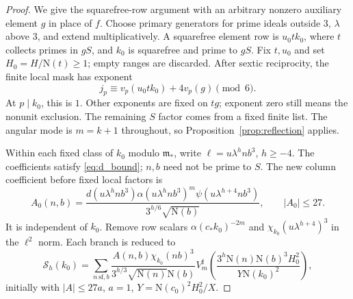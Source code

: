 \documentclass[11pt,a4paper]{article}
\numberwithin{equation}{section}
\theoremstyle{definition}
\theoremstyle{remark}
\newcommand{\N}{\mathrm N}
\begin{document}
\begin{proof}
We give the squarefree-row argument with an arbitrary nonzero auxiliary element $g$ in place of $f$. Choose primary generators for prime ideals outside $3$, $\lambda$ above $3$, and extend multiplicatively. A squarefree element row is $u_0tk_0$, where $t$ collects primes in $gS$, and $k_0$ is squarefree and prime to $gS$. Fix $t,u_0$ and set $H_0=H/\N(t)\ge1$; empty ranges are discarded. After sextic reciprocity, the finite local mask has exponent
\[
 j_p\equiv v_p(u_0tk_0)+4v_p(g)\pmod6.
\]
At $p\mid k_0$, this is $1$. Other exponents are fixed on $tg$; exponent zero still means the nonunit exclusion. The remaining $S$ factor comes from a fixed finite list. The angular mode is $m=k+1$ throughout, so Proposition~\ref{prop:reflection} applies.

Within each fixed class of $k_0$ modulo $\mathfrak m_*$, write $\ell=u\lambda^hnb^3$, $h\ge-4$. The coefficients satisfy \eqref{eq:d_bound}; $n,b$ need not be prime to $S$. The new column coefficient before fixed local factors is
\[
 A_0(n,b)=\frac{d(u\lambda^hnb^3)\alpha(u\lambda^hnb^3)^m\psi(u\lambda^{h+4}nb^3)}{3^{h/6}\sqrt{\N(b)}},
 \qquad |A_0|\le27.
\]
It is independent of $k_0$. Remove row scalars $\alpha(c_*k_0)^{-2m}$ and $\chi_{k_0}(u\lambda^{h+4})^3$ in the $\ell^2$ norm. Each branch is reduced to
\begin{equation}\label{eq:Sbranch}
 \mathscr S_h(k_0)=\sum_{n\ \mathrm{sf},b}
 \frac{A(n,b)\chi_{k_0}(nb)^3}{3^{h/3}\sqrt{\N(n)}\N(b)}
 V_m^\sharp\left(\frac{3^h\N(n)\N(b)^3H_0^2}{Y\N(k_0)^2}\right),
\end{equation}
initially with $|A|\le27a$, $a=1$, $Y=\N(c_0)^2H_0^2/X$.


\end{proof}
\end{document}
